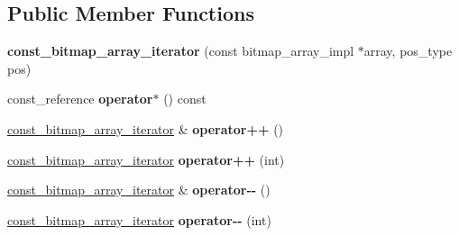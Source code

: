\subsection*{Public Member Functions}
\begin{DoxyCompactItemize}
\item 
\mbox{\label{classdialog_1_1const__bitmap__array__iterator_a7075d06f7ecc1451caf6bc6221f9528b}} 
{\bfseries const\+\_\+bitmap\+\_\+array\+\_\+iterator} (const bitmap\+\_\+array\+\_\+impl $\ast$array, pos\+\_\+type pos)
\item 
\mbox{\label{classdialog_1_1const__bitmap__array__iterator_aa51fa9055e17992e79dffdb431b2d0ea}} 
const\+\_\+reference {\bfseries operator$\ast$} () const
\item 
\mbox{\label{classdialog_1_1const__bitmap__array__iterator_ae9b0bea5c8a23df628954b56a87672cb}} 
\hyperlink{classdialog_1_1const__bitmap__array__iterator}{const\+\_\+bitmap\+\_\+array\+\_\+iterator} \& {\bfseries operator++} ()
\item 
\mbox{\label{classdialog_1_1const__bitmap__array__iterator_a72ba600427e03a626ee7dc31c20936ff}} 
\hyperlink{classdialog_1_1const__bitmap__array__iterator}{const\+\_\+bitmap\+\_\+array\+\_\+iterator} {\bfseries operator++} (int)
\item 
\mbox{\label{classdialog_1_1const__bitmap__array__iterator_a8c5e46157e5b6e718a082708e5ad0250}} 
\hyperlink{classdialog_1_1const__bitmap__array__iterator}{const\+\_\+bitmap\+\_\+array\+\_\+iterator} \& {\bfseries operator-\/-\/} ()
\item 
\mbox{\label{classdialog_1_1const__bitmap__array__iterator_a95edb0c5d6e7543ec66c02b7ee06a277}} 
\hyperlink{classdialog_1_1const__bitmap__array__iterator}{const\+\_\+bitmap\+\_\+array\+\_\+iterator} {\bfseries operator-\/-\/} (int)
\item 
\mbox{\label{classdialog_1_1const__bitmap__array__iterator_ab66b6c645e81ea26d7fd5d6992f30b2f}} 

\end{DoxyCompactItemize}
